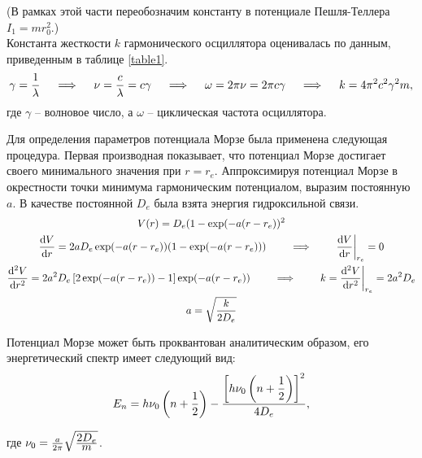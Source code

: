 (В рамках этой части переобозначим константу в потенциале Пешля-Теллера $I_1 = m r_0^2$.) \\
Константа жесткости $k$ гармонического осциллятора оценивалась по данным, приведенным в таблице \eqref{table1}. 
\vverh
\begin{gather}
\gamma = \frac{1}{\lambda} \quad \implies \quad 
\nu = \frac{c}{\lambda} = c \gamma \quad \implies \quad
\omega = 2 \pi \nu = 2 \pi c \gamma \quad \implies \quad
k = 4 \pi^2 c^2 \gamma^2 m , \notag 
\end{gather}
где $\gamma$ -- волновое число, а $\omega$ -- циклическая частота осциллятора. \par
Для определения параметров потенциала Морзе была применена следующая процедура. Первая производная показывает, что потенциал Морзе достигает своего минимального значения при $r = r_e$. Аппроксимируя потенциал Морзе в окрестности точки минимума гармоническим потенциалом, выразим постоянную $a$. В качестве постоянной $D_e$ была взята энергия гидроксильной связи. 
\vverh
\begin{gather}
V(r) = D_e (1 - \exp (- a (r - r_e))^2 \notag \\
\frac{\mathrm{d}V}{\mathrm{d}r} = 2 a D_e \exp (- a (r - r_e)) (1 - \exp (-a (r - r_e))) 
\qquad \implies \qquad \frac{\mathrm{d}V}{\mathrm{d}r} \bigg{|}_{r_e} = 0 \notag \\
\frac{\mathrm{d}^2 V}{\mathrm{d}r^2} = 2 a^2 D_e \left[ 2 \exp (-a (r - r_e)) - 1 \right] \exp (-a (r - r_e)) \qquad \implies \qquad k = \frac{\mathrm{d}^2 V}{\mathrm{d}r^2} \bigg{|}_{r_e} = 2 a^2 D_e \notag \\
a = \sqrt{\frac{\displaystyle k}{\displaystyle 2D_e}} \notag
\end{gather}

Потенциал Морзе может быть проквантован аналитическим образом, его энергетический спектр имеет следующий вид:
\vverh
\begin{gather}
E_n = h \nu_0 \left( n + \frac{1}{2} \right) - \frac{\displaystyle \left[ h \nu_0 \left( n + \frac{1}{2} \right) \right]^2 }{\displaystyle 4 D_e}, \notag
\end{gather} 

\vlevo где $\nu_0 = \frac{a}{2 \pi} \sqrt{\frac{\displaystyle 2 D_e}{\displaystyle m}}$.